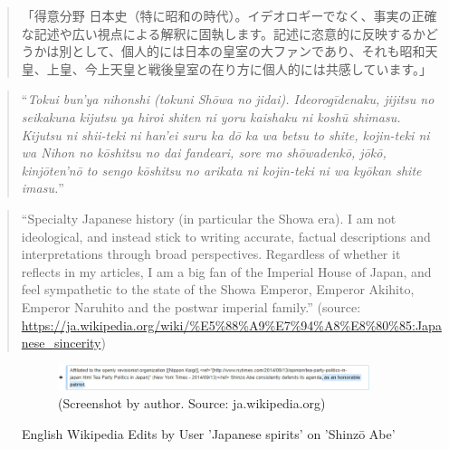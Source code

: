 \documentclass[10pt,british,A4paper,,openany]{memoir}
\begin{document}
\begin{quote}
「得意分野\newline
日本史（特に昭和の時代）。イデオロギーでなく、事実の正確な記述や広い視点による解釈に固執します。記述に恣意的に反映するかどうかは別として、個人的には日本の皇室の大ファンであり、それも昭和天皇、上皇、今上天皇と戦後皇室の在り方に個人的には共感しています。」
\end{quote}

\begin{quote}
``\emph{Tokui bun'ya\newline
nihonshi (tokuni Shōwa no jidai). Ideorogīdenaku, jijitsu no seikakuna
kijutsu ya hiroi shiten ni yoru kaishaku ni koshū shimasu. Kijutsu ni
shii-teki ni han'ei suru ka dō ka wa betsu to shite, kojin-teki ni wa
Nihon no kōshitsu no dai fandeari, sore mo shōwadenkō, jōkō, kinjōten'nō
to sengo kōshitsu no arikata ni kojin-teki ni wa kyōkan shite imasu.}''
\end{quote}

\begin{quote}
``Specialty\newline
Japanese history (in particular the Showa era). I am not ideological,
and instead stick to writing accurate, factual descriptions and
interpretations through broad perspectives. Regardless of whether it
reflects in my articles, I am a big fan of the Imperial House of Japan,
and feel sympathetic to the state of the Showa Emperor, Emperor Akihito,
Emperor Naruhito and the postwar imperial family.'' (source:
\url{https://ja.wikipedia.org/wiki/\%E5\%88\%A9\%E7\%94\%A8\%E8\%80\%85:Japanese_sincerity})
\end{quote}

\begin{figure}[!htb]
 \centering
 \begin{subfigure}[b]{1\textwidth}
  \includegraphics[width=.9\textwidth]{images/wiki/japanese-spirits-abe.jpg}
  \caption*{(Screenshot by author. Source: ja.wikipedia.org)}
 \end{subfigure}
 \caption{English Wikipedia Edits by User 'Japanese spirits' on 'Shinzō Abe'}\label{fig:js-abe}
\end{figure}
\end{document}
